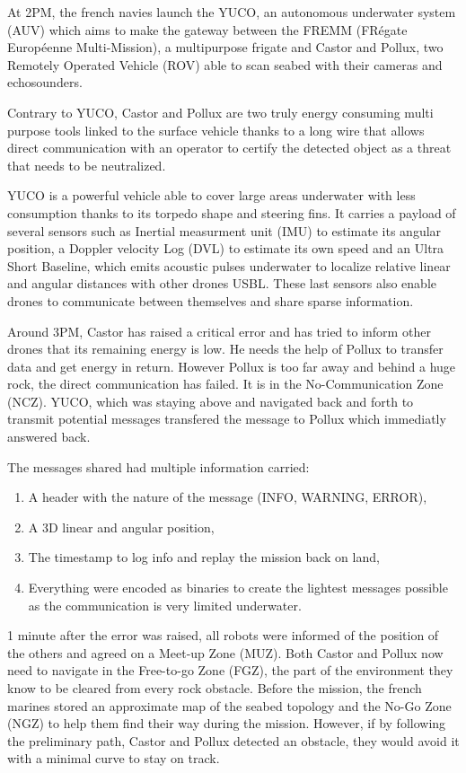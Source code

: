 \documentclass[twocolumn]{article}
\begin{document}
At 2PM, the french navies launch the YUCO, an autonomous underwater system (AUV) which aims to make the gateway between the FREMM (FRégate Européenne Multi-Mission), a multipurpose frigate and Castor and Pollux, two Remotely Operated Vehicle (ROV) able to scan seabed with their cameras and echosounders.

Contrary to YUCO, Castor and Pollux are two truly energy consuming multi purpose tools linked to the surface vehicle thanks to a long wire that allows direct communication with an operator to certify the detected object as a threat that needs to be neutralized.

YUCO is a powerful vehicle able to cover large areas underwater with less consumption thanks to its torpedo shape and steering fins. It carries a payload of several sensors such as Inertial measurment unit (IMU) to estimate its angular position, a Doppler velocity Log (DVL) to estimate its own speed and an Ultra Short Baseline, which emits acoustic pulses underwater to localize relative linear and angular distances with other drones USBL. These last sensors also enable drones to communicate between themselves and share sparse information.

Around 3PM, Castor has raised a critical error and has tried to inform other drones that its remaining energy is low. He needs the help of Pollux to transfer data and get energy in return. However Pollux is too far away and behind a huge rock, the direct communication has failed. It is in the No-Communication Zone (NCZ). YUCO, which was staying above and navigated back and forth to transmit potential messages transfered the message to Pollux which immediatly answered back.

The messages shared had multiple information carried:
\begin{enumerate}
    \item A header with the nature of the message (INFO, WARNING, ERROR),
    \item A 3D linear and angular position,
    \item The timestamp to log info and replay the mission back on land,
    \item Everything were encoded as binaries to create the lightest messages possible as the communication is very limited underwater.
\end{enumerate}

1 minute after the error was raised, all robots were informed of the position of the others and agreed on a Meet-up Zone (MUZ). Both Castor and Pollux now need to navigate in the Free-to-go Zone (FGZ), the part of the environment they know to be cleared from every rock obstacle. Before the mission, the french marines stored an approximate map of the seabed topology and the No-Go Zone (NGZ) to help them find their way during the mission. However, if by following the preliminary path, Castor and Pollux detected an obstacle, they would avoid it with a minimal curve to stay on track.
\end{document}
